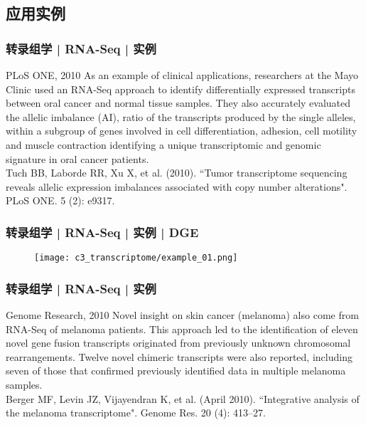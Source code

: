 \subsection{应用实例}
\begin{frame}
  \frametitle{转录组学 | RNA-Seq | 实例}
  \begin{block}{PLoS ONE, 2010}
  As an example of clinical applications, researchers at the Mayo Clinic used an RNA-Seq approach to identify differentially expressed transcripts between oral cancer and normal tissue samples. They also accurately evaluated the allelic imbalance (AI), ratio of the transcripts produced by the single alleles, within a subgroup of genes involved in cell differentiation, adhesion, cell motility and muscle contraction identifying a unique transcriptomic and genomic signature in oral cancer patients.\\
  \vspace{0.5em}
 Tuch BB, Laborde RR, Xu X, et al. (2010). ``Tumor transcriptome sequencing reveals allelic expression imbalances associated with copy number alterations". PLoS ONE. 5 (2): e9317. 
  \end{block}
\end{frame}

\begin{frame}
  \frametitle{转录组学 | RNA-Seq | 实例 | DGE}
  \begin{figure}
    \centering
    \texttt{[image: c3\_transcriptome/example\_01.png]}
  \end{figure}
\end{frame}

\begin{frame}
  \frametitle{转录组学 | RNA-Seq | 实例}
  \begin{block}{Genome Research, 2010}
   Novel insight on skin cancer (melanoma) also come from RNA-Seq of melanoma patients. This approach led to the identification of eleven novel gene fusion transcripts originated from previously unknown chromosomal rearrangements. Twelve novel chimeric transcripts were also reported, including seven of those that confirmed previously identified data in multiple melanoma samples.\\
   \vspace{0.5em}
Berger MF, Levin JZ, Vijayendran K, et al. (April 2010). ``Integrative analysis of the melanoma transcriptome". Genome Res. 20 (4): 413–27. 
  \end{block}
\end{frame}

